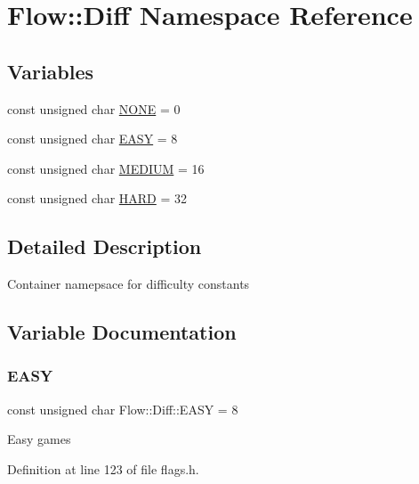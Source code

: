 \hypertarget{namespace_flow_1_1_diff}{}\section{Flow\+:\+:Diff Namespace Reference}
\label{namespace_flow_1_1_diff}
\subsection*{Variables}
\begin{DoxyCompactItemize}
\item 
const unsigned char \hyperlink{namespace_flow_1_1_diff_a25211e3502f69e2908f0f7a0704a791c}{N\+O\+NE} = 0
\item 
const unsigned char \hyperlink{namespace_flow_1_1_diff_a74626099944a6e3bba9dd65249e2d1af}{E\+A\+SY} = 8
\item 
const unsigned char \hyperlink{namespace_flow_1_1_diff_a2a571fad912e041a39f438cdabb5b205}{M\+E\+D\+I\+UM} = 16
\item 
const unsigned char \hyperlink{namespace_flow_1_1_diff_afda4e2a42f3b99975b1c79d953424f59}{H\+A\+RD} = 32
\end{DoxyCompactItemize}


\subsection{Detailed Description}
Container namepsace for difficulty constants 

\subsection{Variable Documentation}
\hypertarget{namespace_flow_1_1_diff_a74626099944a6e3bba9dd65249e2d1af}{}\label{namespace_flow_1_1_diff_a74626099944a6e3bba9dd65249e2d1af} 
\subsubsection{\texorpdfstring{E\+A\+SY}{EASY}}
{\footnotesize\ttfamily const unsigned char Flow\+::\+Diff\+::\+E\+A\+SY = 8}

Easy games 

Definition at line 123 of file flags.\+h.

\hypertarget{namespace_flow_1_1_diff_afda4e2a42f3b99975b1c79d953424f59}{}\label{namespace_flow_1_1_diff_afda4e2a42f3b99975b1c79d953424f59} 
